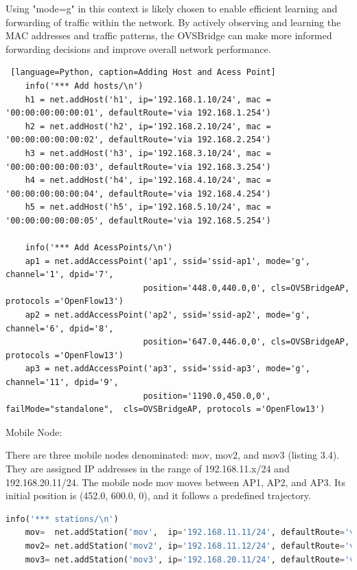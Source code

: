 \documentclass[
  oneside,
  11pt, a4paper,
  footinclude=true,
  headinclude=true,
  cleardoublepage=empty
]{scrbook}
\begin{document}
Using "mode=g" in this context is likely chosen to enable efficient learning and forwarding of traffic within the network. By actively observing and learning the MAC addresses and traffic patterns, the OVSBridge can make more informed forwarding decisions and improve overall network performance.

\begin{lstlisting} [language=Python, caption=Adding Host and Acess Point]
    info('*** Add hosts/\n')
    h1 = net.addHost('h1', ip='192.168.1.10/24', mac = '00:00:00:00:00:01', defaultRoute='via 192.168.1.254')
    h2 = net.addHost('h2', ip='192.168.2.10/24', mac = '00:00:00:00:00:02', defaultRoute='via 192.168.2.254')
    h3 = net.addHost('h3', ip='192.168.3.10/24', mac = '00:00:00:00:00:03', defaultRoute='via 192.168.3.254')
    h4 = net.addHost('h4', ip='192.168.4.10/24', mac = '00:00:00:00:00:04', defaultRoute='via 192.168.4.254')
    h5 = net.addHost('h5', ip='192.168.5.10/24', mac = '00:00:00:00:00:05', defaultRoute='via 192.168.5.254')

    info('*** Add AcessPoints/\n')
    ap1 = net.addAccessPoint('ap1', ssid='ssid-ap1', mode='g', channel='1', dpid='7',
                            position='448.0,440.0,0', cls=OVSBridgeAP, protocols ='OpenFlow13')
    ap2 = net.addAccessPoint('ap2', ssid='ssid-ap2', mode='g', channel='6', dpid='8',
                            position='647.0,446.0,0', cls=OVSBridgeAP, protocols ='OpenFlow13')
    ap3 = net.addAccessPoint('ap3', ssid='ssid-ap3', mode='g', channel='11', dpid='9',
                            position='1190.0,450.0,0', failMode="standalone",  cls=OVSBridgeAP, protocols ='OpenFlow13')
\end{lstlisting}

Mobile Node:

There are three mobile nodes denominated: mov, mov2, and mov3 (listing 3.4). They are assigned IP addresses in the range of 192.168.11.x/24 and 192.168.20.11/24. The mobile node mov moves between AP1, AP2, and AP3. Its initial position is (452.0, 600.0, 0), and it follows a predefined trajectory.

\begin{lstlisting}[language=Python, caption=Adding Mobile Node] 
    info('*** stations/\n')
    mov=  net.addStation('mov',  ip='192.168.11.11/24', defaultRoute='via 192.168.11.254', position='452.0,600.0,0')
    mov2= net.addStation('mov2', ip='192.168.11.12/24', defaultRoute='via 192.168.11.254',  position='626.0,600.0,0')
    mov3= net.addStation('mov3', ip='192.168.20.11/24', defaultRoute='via 192.168.20.254',  position='1200.0,600.0,0')
    
\end{lstlisting}
\end{document}
